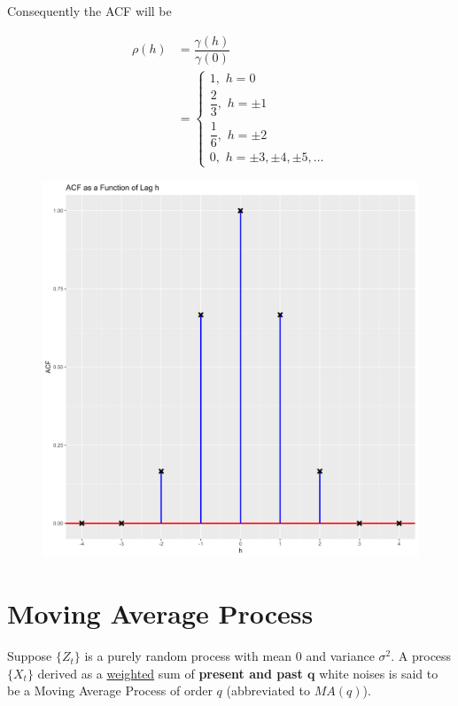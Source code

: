 \documentclass[11pt, a4paper]{article}
\begin{document}
Consequently the ACF will be

\begin{align*}
\rho(h) &= \dfrac{\gamma(h)}{\gamma(0)} \\[0.25em]
&= \begin{cases}
1, \,\, h = 0 \\[1em]
\dfrac{2}{3}, \,\, h = \pm 1 \\[1em]
\dfrac{1}{6}, \,\, h = \pm 2 \\[1em]
0, \,\, h = \pm 3, \pm 4, \pm 5, \ldots
\end{cases}
\end{align*}

\begin{figure}[!htbp]
\centering
\includegraphics[scale=0.5]{ACF_Plot.png}
\end{figure}

\newpage

\section{Moving Average Process}

Suppose $\{Z_t\}$ is a purely random process with mean $0$ and variance $\sigma^2$. A process $\{X_t\}$ derived as a \underline{weighted} sum of \textcolor{col1}{\textbf{present and past $\mathbf{q}$}} white noises is said to be a Moving Average Process of order $q$ (abbreviated to $MA(q)$).
\end{document}
